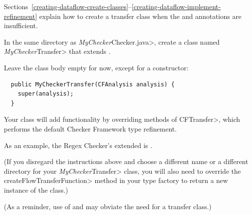 Sections~\ref{creating-dataflow-create-classes}--\ref{creating-dataflow-implement-refinement}
explain how to create a transfer class when the
 and
 annotations are insufficient.



In the same directory as \<\emph{MyChecker}Checker.java>, create a class
named \<\emph{MyChecker}Transfer> that extends
.

Leave the class body empty for now, except for a constructor:

\begin{Verbatim}
  public MyCheckerTransfer(CFAnalysis analysis) {
    super(analysis);
  }
\end{Verbatim}

\noindent
Your class will add functionality by
overriding methods of \<CFTransfer>, which performs the default Checker
Framework type refinement.

As an example, the Regex Checker's extended
 is
.

(If you disregard the instructions above and choose a different name or a
different directory for your \<\emph{MyChecker}Transfer> class, you will
also need to override the \<createFlowTransferFunction> method in your type
factory to return a new instance of the class.)

(As a reminder, use of  and
 may obviate the need for
a transfer class.)

%

